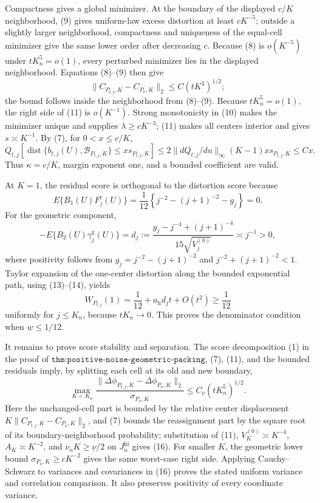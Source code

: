 Compactness gives a global minimizer.  At the boundary of the displayed \(c/K\) neighborhood, (9) gives uniform-law excess distortion at least \(cK^{-5}\); outside a slightly larger neighborhood, compactness and uniqueness of the equal-cell minimizer give the same lower order after decreasing \(c\).  Because (8) is \(o(K^{-5})\) under \(tK_n^5=o(1)\), every perturbed minimizer lies in the displayed neighborhood.  Equations (8)--(9) then give
\[
 \|C_{P_{t,j},K}-C_{P_\nu,K}\|_2\leq C(tK^3)^{1/2};                     \tag{11}
\]
the bound follows inside the neighborhood from (8)--(9).  Because \(tK_n^5=o(1)\), the right side of (11) is \(o(K^{-1})\).  Strong monotonicity in (10) makes the minimizer unique and supplies \(\lambda\geq cK^{-3}\); (11) makes all centers interior and gives \(s\asymp K^{-1}\).  By (7), for \(0<x\leq c/K\),
\[
 Q_{t,j}\!\left[\operatorname{dist}\{b_{t,j}(U),\mathcal B_{P_{t,j},K}\}
 \leq x s_{P_{t,j},K}\right]
 \leq2\|dQ_{t,j}/du\|_\infty(K-1)xs_{P_{t,j},K}\leq Cx.                 \tag{12}
\]
Thus \(\kappa=c/K\), margin exponent one, and a bounded coefficient are valid.

At \(K=1\), the residual score is orthogonal to the distortion score because
\[
 E\{B_1(U)F_j^{\mathrm r}(U)\}
 =\frac1{12}\left\{j^{-2}-(j+1)^{-2}-g_j\right\}=0.                     \tag{13}
\]
For the geometric component,
\[
 -E\{B_2(U)\gamma_j^{\mathrm g}(U)\}
 =d_j:=\frac{g_j-j^{-4}+(j+1)^{-4}}{15\sqrt{V_j^{(0)}}}\asymp j^{-1}>0,  \tag{14}
\]
where positivity follows from \(g_j=j^{-2}-(j+1)^{-2}\) and
\(j^{-2}+(j+1)^{-2}<1\).  Taylor expansion of the one-center distortion along the bounded exponential path, using (13)--(14), yields
\[
 W_{P_{t,j}}(1)=\frac1{12}+a_{\mathrm h}d_jt+O(t^2)\geq\frac1{12}         \tag{15}
\]
uniformly for \(j\leq K_n\), because \(tK_n\to0\).  This proves the denominator condition when \(\underline w\leq1/12\).

It remains to prove score stability and separation.  The score decomposition (1) in the proof of \(\texttt{thm:positive-noise-geometric-packing}\), (7), (11), and the bounded residuals imply, by splitting each cell at its old and new boundary,
\[
 \max_{K<K_n}\frac{\|\Delta\phi_{P_{t,j},K}-\Delta\phi_{P_\nu,K}\|_2}
 {\sigma_{P_\nu,K}}
 \leq C_{\underline\nu}(tK_n^5)^{1/2}.                                  \tag{16}
\]
Here the unchanged-cell part is bounded by the relative center displacement \(K\|C_{P_{t,j},K}-C_{P_\nu,K}\|_2\), and (7) bounds the reassignment part by the square root of its boundary-neighborhood probability; substitution of (11), \(V_K^{(0)}\asymp K^{-4}\), \(A_K\asymp K^{-2}\), and \(\nu_nK\geq\underline\nu/2\) on \(J_n^{\mathrm{hi}}\) gives (16).  For smaller \(K\), the geometric lower bound \(\sigma_{P_\nu,K}\geq cK^{-2}\) gives the same worst-case right side.  Applying Cauchy--Schwarz to variances and covariances in (16) proves the stated uniform variance and correlation comparison.  It also preserves positivity of every coordinate variance.

